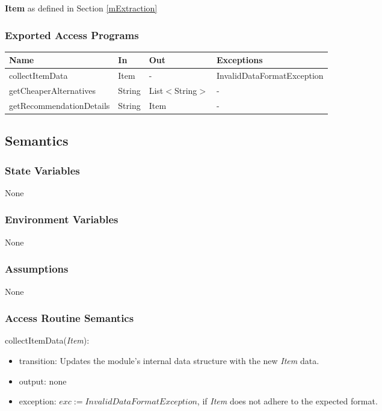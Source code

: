 \documentclass[12pt, titlepage]{article}
\begin{document}
\textbf{Item} as defined in Section \ref{mExtraction} \\

\subsubsection{Exported Access Programs}

\begin{center}
    \begin{tabular}{p{5cm} p{3cm} p{3cm} p{5cm}}
    \hline
    \textbf{Name} & \textbf{In} & \textbf{Out} & \textbf{Exceptions} \\
    \hline
    collectItemData & Item & - & InvalidDataFormatException \\
    getCheaperAlternatives & String & List$<$String$>$ & - \\
    getRecommendationDetails & String & Item & - \\
    \hline
    \end{tabular}
\end{center}

\subsection{Semantics}

\subsubsection{State Variables}

None

\subsubsection{Environment Variables}

None

\subsubsection{Assumptions}

None

\subsubsection{Access Routine Semantics}

\noindent collectItemData(\textit{Item}):
\begin{itemize}
  \item transition: Updates the module's internal data structure with the new \textit{Item} data.
  \item output: none
  \item exception: $exc := \textit{InvalidDataFormatException}$, if \textit{Item} does not adhere to the expected format.
\end{itemize}
\end{document}
